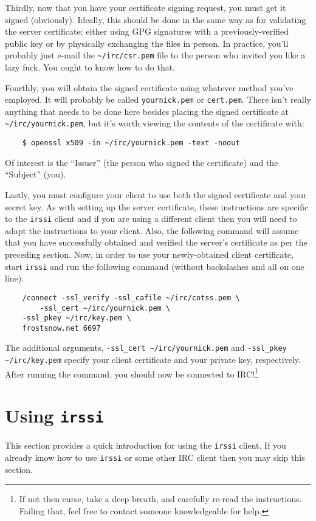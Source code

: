 \documentclass{article}
\begin{document}
{Thirdly, now that you have your certificate signing request, you must get it signed (obviously).  Ideally, this should be done in the same way as for validating the server certificate: either using GPG signatures with a previously-verified public key or by physically exchanging the files in person.  In practice, you'll probably just e-mail the \texttt{\textasciitilde/irc/csr.pem} file to the person who invited you like a lazy fuck.  You ought to know how to do that.

Fourthly, you will obtain the signed certificate using whatever method you've employed.  It will probably be called \texttt{yournick.pem} or \texttt{cert.pem}.  There isn't really anything that needs to be done here besides placing the signed certificate at \texttt{\textasciitilde/irc/yournick.pem}, but it's worth viewing the contents of the certificate with:
\begin{lstlisting}
    $ openssl x509 -in ~/irc/yournick.pem -text -noout
\end{lstlisting}
Of interest is the ``Issuer'' (the person who signed the certificate) and the ``Subject'' (you).

Lastly, you must configure your client to use both the signed certificate and your secret key.  As with setting up the server certificate, these instructions are specific to the \texttt{irssi} client and if you are using a different client then you will need to adapt the instructions to your client.  Also, the following command will assume that you have successfully obtained and verified the server's certificate as per the preceding section.  Now, in order to use your newly-obtained client certificate, start \texttt{irssi} and run the following command (without backslashes and all on one line):
\begin{lstlisting}
    /connect -ssl_verify -ssl_cafile ~/irc/cotss.pem \
        -ssl_cert ~/irc/yournick.pem \
	-ssl_pkey ~/irc/key.pem \
	frostsnow.net 6697
\end{lstlisting}
The additional arguments, \texttt{-ssl\_cert \textasciitilde/irc/yournick.pem} and \texttt{-ssl\_pkey \textasciitilde/irc/key.pem} specify your client certificate and your private key, respectively.  After running the command, you should now be connected to IRC!\footnote{If not then curse, take a deep breath, and carefully re-read the instructions.  Failing that, feel free to contact someone knowledgeable for help.}

\section{Using \texttt{irssi}}
This section provides a quick introduction for using the \texttt{irssi} client.  If you already know how to use \texttt{irssi} or some other IRC client then you may skip this section.

}
\end{document}
